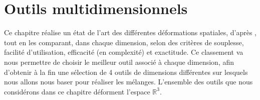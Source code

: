 
\chapter{Outils multidimensionnels}

\graphicspath{{Chapter1/Chapter1Figs/PNG/}{Chapter1/Chapter1Figs/PDF/}{Chapter1/Chapter1Figs/}}

Ce chapitre réalise un état de l'art des différentes déformations
spatiales, d'après \cite{GB08}, tout en les comparant, dans chaque
dimension, selon des critères de souplesse, facilité d'utilisation,
efficacité (en complexité) et exactitude. Ce classement va nous
permettre de choisir le meilleur outil associé à chaque dimension,
afin d'obtenir à la fin une sélection de 4 outils de dimensions
différentes sur lesquels nous allons nous baser pour réaliser les
mélanges. L'ensemble des outils que nous considérons dans ce chapitre
déforment l'espace $\mathbb{R}^3$.

